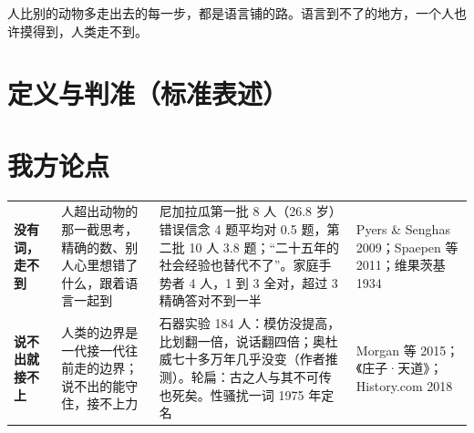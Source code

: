 \documentclass[quick,pro]{debate}
\begin{document}
\debatetitle
\begin{thesisbox}人比别的动物多走出去的每一步，都是语言铺的路。语言到不了的地方，一个人也许摸得到，人类走不到。\end{thesisbox}

\section{定义与判准（标准表述）}
\begin{fields}
\end{fields}

\section{我方论点}
\begin{tabularx}{\linewidth}{@{}L{5.2em}Y Y L{6.5em}@{}}\toprule
{}&&&\\\midrule
\textbf{没有词，走不到}&人超出动物的那一截思考，精确的数、别人心里想错了什么，跟着语言一起到&尼加拉瓜第一批 8 人（26.8 岁）错误信念 4 题平均对 0.5 题，第二批 10 人 3.8 题；“二十五年的社会经验也替代不了”。家庭手势者 4 人，1 到 3 全对，超过 3 精确答对不到一半&Pyers \& Senghas 2009；Spaepen 等 2011；维果茨基 1934\\
\textbf{说不出就接不上}&人类的边界是一代接一代往前走的边界；说不出的能守住，接不上力&石器实验 184 人：模仿没提高，比划翻一倍，说话翻四倍；奥杜威七十多万年几乎没变（作者推测）。轮扁：古之人与其不可传也死矣。性骚扰一词 1975 年定名&Morgan 等 2015；《庄子·天道》；History.com 2018\\
\bottomrule\end{tabularx}
\end{document}
